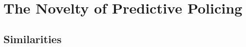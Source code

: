 \documentclass[12pt]{article} %
\begin{document}









\section{The Novelty of Predictive Policing}\label{sec:oldvsnew} %

\subsection{Similarities} \label{subsec:Similarities}
\end{document}
